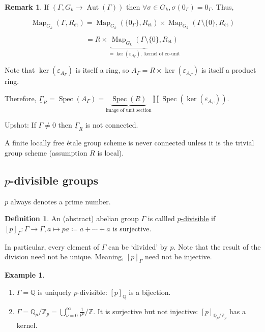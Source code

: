 \documentclass{article}
\theoremstyle{definition}
\newtheorem*{example}{Example}
\newtheorem*{definition}{Definition}
\numberwithin{theorem}{subsection}
\newtheorem*{remark}{Remark}
\begin{document}
    \begin{remark}
        If \((\Gamma, G_k \to \operatorname{Aut}(\Gamma))\) then \(\forall \sigma \in G_k, \sigma(0_\Gamma) = 0_\Gamma\). Thus,
        
        \[
            \operatorname{Map}_{G_k}(\Gamma, R_{\text{\'et}}) = \operatorname{Map}_{G_k}(\{ 0_\Gamma \}, R_{\text{\'et}}) \times \operatorname{Map}_{G_k}(\Gamma \setminus \{ 0 \} , R_{\text{\'et}})
        \]
        
        \[
            = R \times \underbrace{\operatorname{Map}_{G_k}(\Gamma \setminus \{ 0 \}, R_{\text{\'et}})}_{=\ker(\varepsilon_{A_\Gamma}), \text{ kernel of co-unit}}
        \] 

        Note that \(\ker(\varepsilon_{A_\Gamma})\) is itself a ring, so \(A_\Gamma = R \times \ker(\varepsilon_{A_\Gamma})\) is itself a product ring.

        Therefore, \(\underline{\Gamma}_R = \operatorname{Spec}(A_\Gamma) = \underbrace{\operatorname{Spec}(R)}_{\text{image of unit section}} \coprod \operatorname{Spec}(\ker(\varepsilon_{A_\Gamma}))\).
        
        Upshot: If \(\Gamma \neq 0\) then \(\underline{\Gamma}_R\) is not connected.

        A finite locally free \'etale group scheme is never connected unless it is the trivial group scheme (assumption \(R\) is local).


    \end{remark}

    \subsection{\(p\)-divisible groups}

    \(p\) always denotes a prime number.

    \begin{definition}
        An (abstract) abelian group \(\Gamma\) is callled \underline{\(p\)-divisible} if \([p]_\Gamma : \Gamma \to \Gamma, a \mapsto pa \coloneqq a + \cdots + a\) is surjective.

        In particular, every element of \(\Gamma\) can be `divided' by \(p\). Note that the result of the division need not be unique. Meaning, \([p]_\Gamma\) need not be injective.
    \end{definition}

    \begin{example}
        \begin{enumerate}[label=\arabic*)]
            \item \(\Gamma = \mathbb{Q}\) is uniquely \(p\)-divisible: \([p]_{\mathbb{Q}}\) is a bijection.
            \item \(\Gamma = \mathbb{Q}_p / \mathbb{Z}_p = \bigcup_{\nu=0}^{\infty} \frac{1}{p^{\nu}} / \mathbb{Z}\). It is surjective but not injective: \([p]_{\mathbb{Q}_p / \mathbb{Z}_p}\) has a kernel.
        \end{enumerate} 
    \end{example}
\end{document}
